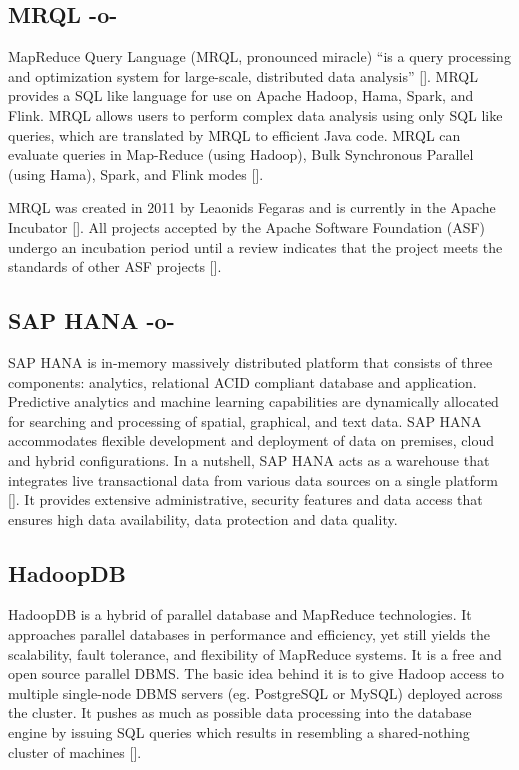 \subsection{MRQL -o-}

MapReduce Query Language (MRQL, pronounced miracle) ``is a query
processing and optimization system for large-scale, distributed data
analysis'' [\cite{www-apachemrql}]. MRQL provides a SQL like language
for use on Apache Hadoop, Hama, Spark, and Flink.  MRQL allows users
to perform complex data analysis using only SQL like queries, which
are translated by MRQL to efficient Java code. MRQL can evaluate
queries in Map-Reduce (using Hadoop), Bulk Synchronous Parallel (using
Hama), Spark, and Flink modes [\cite{www-apachemrql}].

MRQL was created in 2011 by Leaonids Fegaras and is currently in the
Apache Incubator [\cite{www-mrqlhadoop}].  All projects accepted by the
Apache Software Foundation (ASF) undergo an incubation period until a
review indicates that the project meets the standards of other ASF
projects [\cite{www-apacheincubator}].



\subsection{SAP HANA -o-}

SAP HANA is in-memory massively distributed platform that consists of
three components: analytics, relational ACID compliant database and
application\cite{www-sap-hana}. Predictive analytics and machine
learning capabilities are dynamically allocated for searching and
processing of spatial, graphical, and text data.  SAP HANA
accommodates flexible development and deployment of data on premises,
cloud and hybrid configurations.  In a nutshell, SAP HANA acts as a
warehouse that integrates live transactional data from various data
sources on a single platform [\cite{olofson-2014}]. It provides
extensive administrative, security features and data access that
ensures high data availability, data protection and data quality.


   

\subsection{HadoopDB}
    
HadoopDB is a hybrid of parallel database and MapReduce
technologies. It approaches parallel databases in performance and
efficiency, yet still yields the scalability, fault tolerance, and
flexibility of MapReduce systems. It is a free and open source
parallel DBMS. The basic idea behind it is to give Hadoop access to
multiple single-node DBMS servers (eg. PostgreSQL or MySQL) deployed
across the cluster. It pushes as much as possible data processing into
the database engine by issuing SQL queries which results in resembling
a shared-nothing cluster of machines [\cite{www-hadoopdb}].

